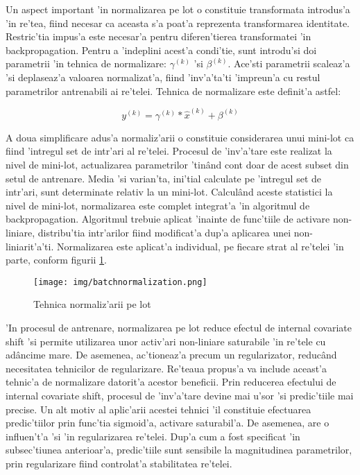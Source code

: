 \documentclass[12pt,a4paper,twoside]{report}
\begin{document}
Un aspect important 'in normalizarea pe lot o constituie transformata introdus'a 'in re'tea, fiind necesar ca aceasta s'a poat'a reprezenta transformarea identitate. Restric'tia impus'a este necesar'a pentru diferen'tierea transformatei 'in backpropagation. Pentru a 'indeplini acest'a condi'tie, sunt introdu'si doi parametrii 'in tehnica de normalizare: $\gamma^{(k)}$ 'si $\beta^{(k)}$. Ace'sti parametrii scaleaz'a 'si deplaseaz'a valoarea normalizat'a, fiind 'inv'a'ta'ti 'impreun'a cu restul parametrilor antrenabili ai re'telei. Tehnica de normalizare este definit'a astfel:

\begin{equation}
y^{(k)} = \gamma^{(k)}*\hat{x}^{(k)} + \beta^{(k)}
\end{equation}

A doua simplificare adus'a normaliz'arii o constituie considerarea unui mini-lot ca fiind 'intregul set de intr'ari al re'telei. Procesul de 'inv'a'tare este realizat la nivel de mini-lot, actualizarea parametrilor 'tin\^and cont doar de acest subset din setul de antrenare. Media 'si varian'ta, ini'tial calculate pe 'intregul set de intr'ari, sunt determinate relativ la un mini-lot. Calcul\^and aceste statistici la nivel de mini-lot, normalizarea este complet integrat'a 'in algoritmul de backpropagation. Algoritmul trebuie aplicat 'inainte de func'tiile de activare non-liniare, distribu'tia intr'arilor fiind modificat'a dup'a aplicarea unei non-liniarit'a'ti. Normalizarea este aplicat'a individual, pe fiecare strat al re'telei 'in parte, conform figurii \ref{fig:batchnorm}.

\begin{figure}[H]
  \texttt{[image: img/batchnormalization.png]}
  \centering
  \caption{Tehnica normaliz'arii pe lot \protect\footnotemark}
  \label{fig:batchnorm}
\end{figure}

'In procesul de antrenare, normalizarea pe lot reduce efectul de internal covariate shift 'si permite utilizarea unor activ'ari non-liniare saturabile 'in re'tele cu ad\^ancime mare. De asemenea, ac'tioneaz'a precum un regularizator, reduc\^and necesitatea tehnicilor de regularizare. Re'teaua propus'a va include aceast'a tehnic'a de normalizare datorit'a acestor beneficii. Prin reducerea efectului de internal covariate shift, procesul de 'inv'a'tare devine mai u'sor 'si predic'tiile mai precise. Un alt motiv al aplic'arii acestei tehnici 'il constituie efectuarea predic'tiilor prin func'tia sigmoid'a, activare saturabil'a. De asemenea, are o influen't'a 'si 'in regularizarea re'telei. Dup'a cum a fost specificat 'in subsec'tiunea anterioar'a, predic'tiile sunt sensibile la magnitudinea parametrilor, prin regularizare fiind controlat'a stabilitatea re'telei.
\end{document}
